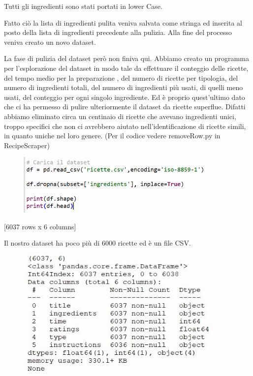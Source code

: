 \documentclass[12pt]{report}
\begin{document}
Tutti gli ingredienti sono stati portati in lower Case.

Fatto ciò la lista di ingredienti pulita veniva salvata come stringa ed inserita al posto della lista di ingredienti precedente alla pulizia. Alla fine del processo veniva creato un novo dataset.

La fase di pulizia del dataset però non finiva qui. Abbiamo creato un programma per l’esplorazione del dataset in modo tale da effettuare il conteggio delle ricette, del tempo medio per la preparazione , del numero di ricette per tipologia, del numero di ingredienti totali, del numero di ingredienti più usati, di quelli meno usati, del conteggio per ogni singolo ingrediente. Ed è proprio quest’ultimo dato che ci ha permesso di pulire ulteriormente il dataset da ricette superflue. Difatti abbiamo eliminato circa un centinaio di ricette che avevano ingredienti unici, troppo specifici che non ci avrebbero aiutato nell’identificazione di ricette simili, in quanto uniche nel loro genere. (Per il codice vedere removeRow.py in RecipeScraper)

\begin{figure}[H]
        \centering
        {\includegraphics[width=0.9\textwidth]{img/img4.jpg}}
\end{figure}
[6037 rows x 6 columns]

 Il nostro dataset ha poco più di 6000 ricette ed è un file CSV.

\begin{figure}[H]
        \centering
        {\includegraphics[width=0.9\textwidth]{img/img5.jpg}}
\end{figure}
\end{document}
